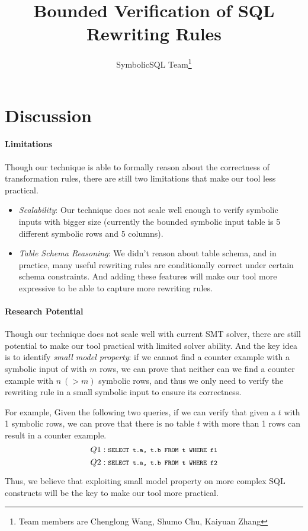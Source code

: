 \documentclass[10pt]{article}
\newcommand{\code}[1]{\texttt{\footnotesize #1}}
\begin{document}
\title{Bounded Verification of SQL Rewriting Rules}
\author{SymbolicSQL Team\footnote{Team members are Chenglong Wang, Shumo Chu, Kaiyuan Zhang}}
\date{}
\maketitle







\section{Discussion}
\paragraph{Limitations} Though our technique is able to formally reason about the correctness of transformation rules, there are still two limitations that make our tool less practical.
\begin{itemize}
\item \emph{Scalability}: Our technique does not scale well enough to verify symbolic inputs with bigger size (currently the bounded symbolic input table is 5 different symbolic rows and 5 columns).
\item \emph{Table Schema Reasoning}: We didn't reason about table schema, and in practice, many useful rewriting rules are conditionally correct under certain schema constraints. And adding these features will make our tool more expressive to be able to capture more rewriting rules.
\end{itemize} 

\paragraph{Research Potential} Though our technique does not scale well with current SMT solver, there are still potential to make our tool practical with limited solver ability. And the key idea is to identify \emph{small model property}: if we cannot find a counter example with a symbolic input of with $m$ rows, we can prove that neither can we find a counter example with $n~(>m)$ symbolic rows, and thus we only need to verify the rewriting rule in a small symbolic input to ensure its correctness.

For example, Given the following two queries, if we can verify that given a $t$ with 1 symbolic rows, we can prove that there is no table $t$ with more than 1 rows can result in a counter example.
$$Q1: \code{SELECT t.a, t.b FROM t WHERE f1}$$
$$Q2: \code{SELECT t.a, t.b FROM t WHERE f2}$$

Thus, we believe that exploiting small model property on more complex SQL constructs will be the key to make our tool more practical.




\end{document}
